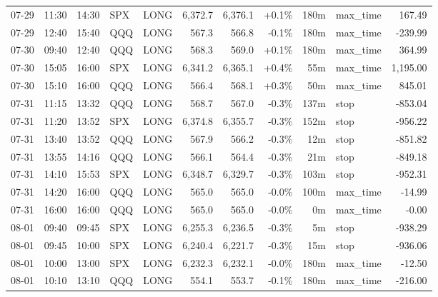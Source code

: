 \documentclass[11pt,a4paper,twoside]{article}
\begin{document}
\begin{center}
\begin{longtable}{>{\color{txtmain}}l l l l l r r r r >{\color{txtmain}}l r}
07-29 & 11:30 & 14:30 & SPX & LONG & 6,372.7 & 6,376.1 & \textcolor{wingreen}{+0.1\%} & 180m & max\_time & \textcolor{wingreen}{167.49} \\
07-29 & 12:40 & 15:40 & QQQ & LONG & 567.3 & 566.8 & \textcolor{lossred}{-0.1\%} & 180m & max\_time & \textcolor{lossred}{-239.99} \\
07-30 & 09:40 & 12:40 & QQQ & LONG & 568.3 & 569.0 & \textcolor{wingreen}{+0.1\%} & 180m & max\_time & \textcolor{wingreen}{364.99} \\
07-30 & 15:05 & 16:00 & SPX & LONG & 6,341.2 & 6,365.1 & \textcolor{wingreen}{+0.4\%} & 55m & max\_time & \textcolor{wingreen}{1,195.00} \\
07-30 & 15:10 & 16:00 & QQQ & LONG & 566.4 & 568.1 & \textcolor{wingreen}{+0.3\%} & 50m & max\_time & \textcolor{wingreen}{845.01} \\
07-31 & 11:15 & 13:32 & QQQ & LONG & 568.7 & 567.0 & \textcolor{lossred}{-0.3\%} & 137m & stop & \textcolor{lossred}{-853.04} \\
07-31 & 11:20 & 13:52 & SPX & LONG & 6,374.8 & 6,355.7 & \textcolor{lossred}{-0.3\%} & 152m & stop & \textcolor{lossred}{-956.22} \\
07-31 & 13:40 & 13:52 & QQQ & LONG & 567.9 & 566.2 & \textcolor{lossred}{-0.3\%} & 12m & stop & \textcolor{lossred}{-851.82} \\
07-31 & 13:55 & 14:16 & QQQ & LONG & 566.1 & 564.4 & \textcolor{lossred}{-0.3\%} & 21m & stop & \textcolor{lossred}{-849.18} \\
07-31 & 14:10 & 15:53 & SPX & LONG & 6,348.7 & 6,329.7 & \textcolor{lossred}{-0.3\%} & 103m & stop & \textcolor{lossred}{-952.31} \\
07-31 & 14:20 & 16:00 & QQQ & LONG & 565.0 & 565.0 & \textcolor{lossred}{-0.0\%} & 100m & max\_time & \textcolor{lossred}{-14.99} \\
07-31 & 16:00 & 16:00 & QQQ & LONG & 565.0 & 565.0 & \textcolor{lossred}{-0.0\%} & 0m & max\_time & \textcolor{lossred}{-0.00} \\
08-01 & 09:40 & 09:45 & SPX & LONG & 6,255.3 & 6,236.5 & \textcolor{lossred}{-0.3\%} & 5m & stop & \textcolor{lossred}{-938.29} \\
08-01 & 09:45 & 10:00 & SPX & LONG & 6,240.4 & 6,221.7 & \textcolor{lossred}{-0.3\%} & 15m & stop & \textcolor{lossred}{-936.06} \\
08-01 & 10:00 & 13:00 & SPX & LONG & 6,232.3 & 6,232.1 & \textcolor{lossred}{-0.0\%} & 180m & max\_time & \textcolor{lossred}{-12.50} \\
08-01 & 10:10 & 13:10 & QQQ & LONG & 554.1 & 553.7 & \textcolor{lossred}{-0.1\%} & 180m & max\_time & \textcolor{lossred}{-216.00} \\

\end{longtable}
\end{center}
\end{document}
